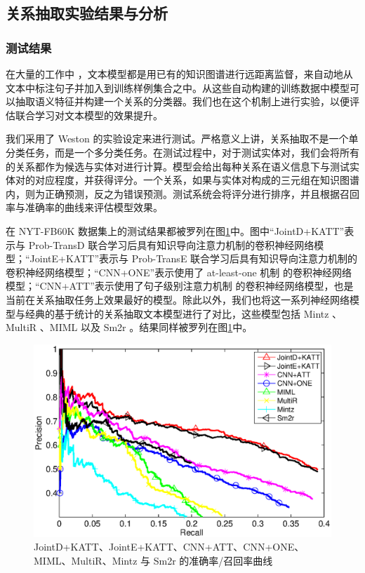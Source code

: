 \subsection{关系抽取实验结果与分析}

\subsubsection{测试结果}

在大量的工作中 \cite{mintz2009distant,riedel2010modeling,hoffmann2011knowledge,surdeanu2012multi,zeng2014relation,zeng2015distant,lin2016neural}，文本模型都是用已有的知识图谱进行远距离监督，来自动地从文本中标注句子并加入到训练样例集合之中。从这些自动构建的训练数据中模型可以抽取语义特征并构建一个关系的分类器。我们也在这个机制上进行实验，以便评估联合学习对文本模型的效果提升。

我们采用了 Weston \cite{weston2013connecting}的实验设定来进行测试。严格意义上讲，关系抽取不是一个单分类任务，而是一个多分类任务。在测试过程中，对于测试实体对，我们会将所有的关系都作为候选与实体对进行计算。模型会给出每种关系在语义信息下与测试实体对的对应程度，并获得评分。一个关系，如果与实体对构成的三元组在知识图谱内，则为正确预测，反之为错误预测。测试系统会将评分进行排序，并且根据召回率与准确率的曲线来评估模型效果。

在 NYT-FB60K 数据集上的测试结果都被罗列在图\ref{fig3:jointcnn}中。图中``JointD+KATT''表示与 Prob-TransD 联合学习后具有知识导向注意力机制的卷积神经网络模型；``JointE+KATT''表示与 Prob-TransE 联合学习后具有知识导向注意力机制的卷积神经网络模型；``CNN+ONE''表示使用了 at-least-one 机制 \cite{zeng2015distant} 的卷积神经网络模型；``CNN+ATT''表示使用了句子级别注意力机制 \cite{lin2016neural} 的卷积神经网络模型，也是当前在关系抽取任务上效果最好的模型。除此以外，我们也将这一系列神经网络模型与经典的基于统计的关系抽取文本模型进行了对比，这些模型包括 Mintz \cite{mintz2009distant}、MultiR \cite{hoffmann2011knowledge}、MIML \cite{surdeanu2012multi} 以及 Sm2r \cite{weston2013connecting}。结果同样被罗列在图\ref{fig3:jointcnn}中。

\begin{figure}[h]
\centering
\includegraphics[width=0.9\columnwidth]{figures/ch3/res.eps}
\caption{JointD+KATT、JointE+KATT、CNN+ATT、CNN+ONE、MIML、MultiR、Mintz 与 Sm2r 的准确率/召回率曲线}
\label{fig3:jointcnn}
\end{figure} 

